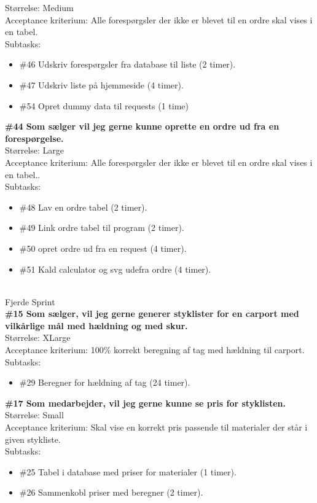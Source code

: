 \documentclass[11pt]{report}
\begin{document}
Størrelse: Medium\\
Acceptance kriterium: Alle forespørgsler der ikke er blevet til en ordre skal vises i en tabel.\\
Subtasks:
\begin{itemize}
\item \#46 Udskriv forespørgsler fra database til liste (2 timer).
\item \#47 Udskriv liste på hjemmeside (4 timer).
\item \#54 Opret dummy data til requests (1 time)
\end{itemize}
\textbf{\#44 Som sælger vil jeg gerne kunne oprette en ordre ud fra en forespørgelse. }\\
Størrelse: Large\\
Acceptance kriterium: Alle forespørgsler der ikke er blevet til en ordre skal vises i en tabel..\\
Subtasks:
\begin{itemize}
\item \#48 Lav en ordre tabel (2 timer).
\item \#49 Link ordre tabel til program (2 timer).
\item \#50 opret ordre ud fra en request (4 timer).
\item \#51 Kald calculator og svg udefra ordre (4 timer).
\end{itemize}
\leavevmode
\\
Fjerde Sprint \\
\textbf{\#15 Som sælger, vil jeg gerne generer styklister for en carport med vilkårlige mål med hældning og med skur. }\\
Størrelse: XLarge\\
Acceptance kriterium: 100\% korrekt beregning af tag med hældning til carport. \\
Subtasks:
\begin{itemize}
\item \#29 Beregner for hældning af tag (24 timer).
\end{itemize}
\textbf{\#17 Som medarbejder, vil jeg gerne kunne se pris for styklisten.}\\
Størrelse: Small\\
Acceptance kriterium: Skal vise en korrekt pris passende til materialer der står i given stykliste. \\
Subtasks:
\begin{itemize}
\item \#25 Tabel i database med priser for materialer (1 timer).
\item \#26 Sammenkobl priser med beregner (2 timer).
\end{itemize}
\end{document}
